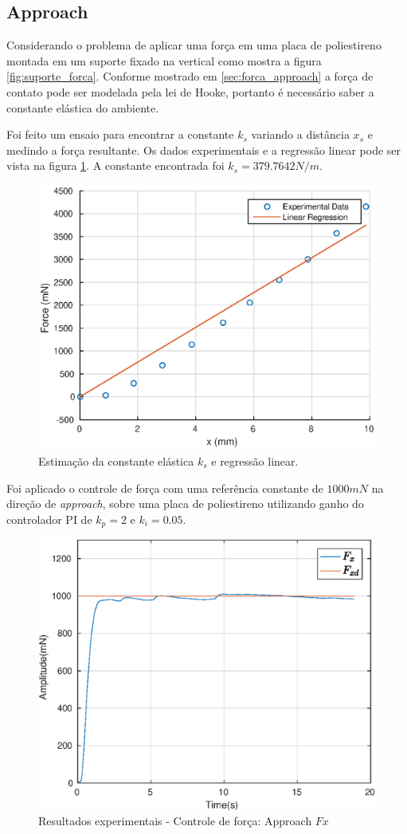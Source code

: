 \subsection{Approach}
Considerando o problema de aplicar uma força em uma placa de poliestireno montada em um suporte fixado na vertical como mostra a figura \ref{fig:suporte_forca}.  Conforme mostrado em \ref{sec:forca_approach} a força de contato pode ser modelada pela lei de Hooke, portanto é necessário saber a constante elástica do ambiente.

Foi feito um ensaio para encontrar a constante $k_s$ variando a distância $x_s$ e medindo a força resultante. Os dados experimentais e a regressão linear pode ser vista na figura \ref{fig:ks_linreg}. A constante encontrada foi $k_s = 379.7642 N/m$.

\begin{figure}[!ht]
\centering
  \includegraphics[width=0.5\linewidth]{./img/ks_estimation.eps}
  \caption{Estimação da constante elástica $k_s$ e regressão linear.}
  \label{fig:ks_linreg}
\end{figure}%

Foi aplicado o controle de força com uma referência constante de $1000 mN$ na direção de \textit{approach}, sobre uma placa de poliestireno utilizando ganho do controlador PI de $k_p = 2$ e $k_i = 0.05$. 

 \begin{figure}[H]
  \centering
  \includegraphics[width=0.5\linewidth]{./img/force1000_kp2_ki005/Fx.eps}
  \caption{Resultados experimentais - Controle de força: Approach $Fx$}
  \label{fig:sub2}
\end{figure}

